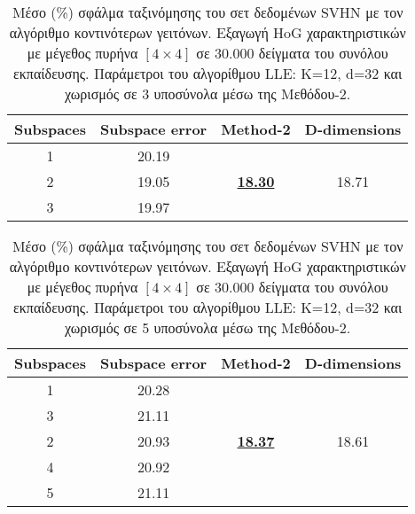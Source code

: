 \begin{table}[H]
\singlespacing
\centering
\label{tab:table15}
\caption{Μέσο (\%) σφάλμα ταξινόμησης του σετ δεδομένων \textlatin{SVHN} με τον αλγόριθμο κοντινότερων γειτόνων. Εξαγωγή \textlatin{HoG} χαρακτηριστικών με μέγεθος πυρήνα $[4\times4]$ σε 30.000 δείγματα του συνόλου εκπαίδευσης. Παράμετροι του αλγορίθμου \textlatin{LLE: K=12, d=32} και χωρισμός σε 3 υποσύνολα μέσω της Μεθόδου-2. }
\vspace*{5mm}
\begin{tabular}{|c|c|c|c|}
\hline
\textlatin{Subspaces} & \textlatin{Subspace error} & \textlatin{Method-2} & \textlatin{D-dimensions}  \\
\hline
1 & 20.19 & & \\
2 & 19.05 & \underline{\textbf{18.30}} & 18.71 \\
3 & 19.97 & & \\
\hline
\end{tabular}
\end{table}

\begin{table}[H]
\singlespacing
\centering
\label{tab:table16}
\caption{Μέσο (\%) σφάλμα ταξινόμησης του σετ δεδομένων \textlatin{SVHN} με τον αλγόριθμο κοντινότερων γειτόνων. Εξαγωγή \textlatin{HoG} χαρακτηριστικών με μέγεθος πυρήνα $[4\times4]$ σε 30.000 δείγματα του συνόλου εκπαίδευσης. Παράμετροι του αλγορίθμου \textlatin{LLE: K=12, d=32} και χωρισμός σε 5 υποσύνολα μέσω της Μεθόδου-2. }
\vspace*{5mm}
\begin{tabular}{|c|c|c|c|}
\hline
\textlatin{Subspaces} & \textlatin{Subspace error} & \textlatin{Method-2} & \textlatin{D-dimensions}  \\
\hline
1 & 20.28 & & \\
3 & 21.11 & & \\
2 & 20.93 & \underline{\textbf{18.37}} & 18.61 \\
4 & 20.92 & & \\
5 & 21.11 & & \\
\hline
\end{tabular}
\end{table}

